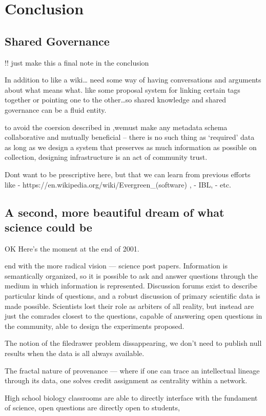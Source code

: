 \documentclass{article}
\begin{document}
\hypertarget{conclusion}{%
\section{Conclusion}\label{conclusion}}

\hypertarget{shared-governance}{%
\subsection{Shared Governance}\label{shared-governance}}

!! just make this a final note in the conclusion

In addition to like a wiki\ldots{} need some way of having conversations
and arguments about what means what. like some proposal system for
linking certain tags together or pointing one to the other\ldots so
shared knowledge and shared governance can be a fluid entity.

to avoid the coersion described in \cite{bietzCollaborationMetagenomicsSequence2009},wemust make any
metadata schema collaborative and mutually beneficial -- there is no
such thing as `required' data as long as we design a system that
preserves as much information as possible on collection, designing
infrastructure is an act of community trust.

Dont want to be prescriptive here, but that we can learn from previous
efforts like - https://en.wikipedia.org/wiki/Evergreen\_(software) , -
IBL, - etc.

\hypertarget{a-second-more-beautiful-dream-of-what-science-could-be}{%
\subsection{A second, more beautiful dream of what science could
be}\label{a-second-more-beautiful-dream-of-what-science-could-be}}

OK Here's the moment at the end of 2001.

end with the more radical vision --- science post papers. Information is
semantically organized, so it is possible to ask and answer questions
through the medium in which information is represented. Discussion
forums exist to describe particular kinds of questions, and a robust
discussion of primary scientific data is made possible. Scientists lost
their role as arbiters of all reality, but instead are just the comrades
closest to the questions, capable of answering open questions in the
community, able to design the experiments proposed.

The notion of the filedrawer problem dissappearing, we don't need to
publish null results when the data is all always available.

The fractal nature of provenance --- where if one can trace an
intellectual lineage through its data, one solves credit assignment as
centrality within a network.

High school biology classrooms are able to directly interface with the
fundament of science, open questions are directly open to students,
\end{document}
